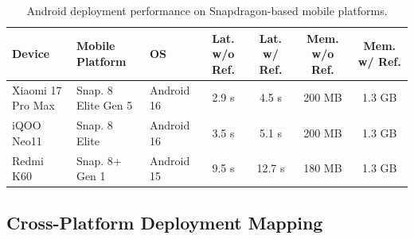 \begin{table}[t]
\centering
\caption{Android deployment performance on Snapdragon-based mobile platforms.}
\label{tab:android_deployment_results}
\footnotesize
\setlength{\tabcolsep}{4pt}
\renewcommand{\arraystretch}{1.10}

\hspace*{-0.020\linewidth}%
\begin{tabular*}{0.98\linewidth}{@{\extracolsep{\fill}}lllcccc@{}}
\toprule
\textbf{Device} &
\textbf{Mobile Platform} &
\textbf{OS} &
\textbf{Lat. w/o Ref.} &
\textbf{Lat. w/ Ref.} &
\textbf{Mem. w/o Ref.} &
\textbf{Mem. w/ Ref.} \\
\midrule

Xiaomi 17 Pro Max &
Snap. 8 Elite Gen 5 &
Android 16 &
2.9 s &
4.5 s &
200 MB &
1.3 GB \\

iQOO Neo11 &
Snap. 8 Elite &
Android 16 &
3.5 s &
5.1 s &
200 MB &
1.3 GB \\

Redmi K60 &
Snap. 8+ Gen 1 &
Android 15 &
9.5 s &
12.7 s &
180 MB &
1.3 GB \\

\bottomrule
\end{tabular*}

\renewcommand{\arraystretch}{1.0}
\end{table}

\subsection{Cross-Platform Deployment Mapping}

